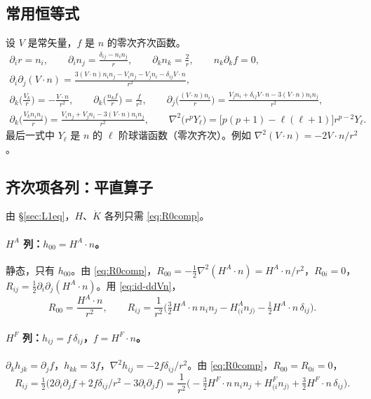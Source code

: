 \documentclass[11pt,a4paper]{ctexart}
\numberwithin{equation}{section}
\begin{document}
\subsection{常用恒等式}

设 $V$ 是常矢量，$f$ 是 $n$ 的零次齐次函数。
\begin{gather}
\partial_ir=n_i,\qquad \partial_in_j=\frac{\delta_{ij}-n_in_j}{r},\qquad \partial_kn_k=\frac2r,\qquad n_k\partial_kf=0,\nonumber\\
\partial_i\partial_j(V\!\cdot n)=\frac{3(V\!\cdot n)n_in_j-V_in_j-V_jn_i-\delta_{ij}V\!\cdot n}{r^2},
\label{eq:id-ddVn}\\
\partial_k\Big(\frac{V_k}{r}\Big)=-\frac{V\!\cdot n}{r^2},\qquad
\partial_k\Big(\frac{n_kf}{r}\Big)=\frac{f}{r^2},\qquad
\partial_j\Big(\frac{(V\!\cdot n)n_i}{r}\Big)=\frac{V_jn_i+\delta_{ij}V\!\cdot n-3(V\!\cdot n)n_in_j}{r^2},
\label{eq:id-div}\\
\partial_k\Big(\frac{V_kn_in_j}{r}\Big)=\frac{V_in_j+V_jn_i-3(V\!\cdot n)n_in_j}{r^2},\qquad
\nabla^2\big(r^pY_\ell\big)=\big[p(p+1)-\ell(\ell+1)\big]r^{p-2}Y_\ell .
\label{eq:id-lap}
\end{gather}
最后一式中 $Y_\ell$ 是 $n$ 的 $\ell$ 阶球谐函数（零次齐次）。例如 $\nabla^2(V\!\cdot n)=-2V\!\cdot n/r^2$。

\subsection{齐次项各列：平直算子}
\label{sec:Hcols}

由 \S\ref{sec:L1eq}，$H$、$\dot K$ 各列只需 \eqref{eq:R0comp}。

\paragraph{$H^A$ 列：$h_{00}=H^A\!\cdot n$。}静态，只有 $h_{00}$。由 \eqref{eq:R0comp}，$R_{00}=-\tfrac12\nabla^2(H^A\!\cdot n)=H^A\!\cdot n/r^2$，$R_{0i}=0$，$R_{ij}=\tfrac12\partial_i\partial_j(H^A\!\cdot n)$。用 \eqref{eq:id-ddVn}，
\begin{equation}
R_{00}=\frac{H^A\!\cdot n}{r^2},\qquad
R_{ij}=\frac1{r^2}\Big(\tfrac32H^A\!\cdot n\,n_in_j-H^A_{(i}n_{j)}-\tfrac12H^A\!\cdot n\,\delta_{ij}\Big).
\end{equation}

\paragraph{$H^F$ 列：$h_{ij}=f\,\delta_{ij}$，$f=H^F\!\cdot n$。}$\partial_kh_{jk}=\partial_jf$，$h_{kk}=3f$，$\nabla^2h_{ij}=-2f\delta_{ij}/r^2$。由 \eqref{eq:R0comp}，$R_{00}=R_{0i}=0$，
\begin{equation}
R_{ij}=\tfrac12\big(2\partial_i\partial_jf+2f\delta_{ij}/r^2-3\partial_i\partial_jf\big)
=\frac1{r^2}\Big(-\tfrac32H^F\!\cdot n\,n_in_j+H^F_{(i}n_{j)}+\tfrac32H^F\!\cdot n\,\delta_{ij}\Big).
\end{equation}
\end{document}
